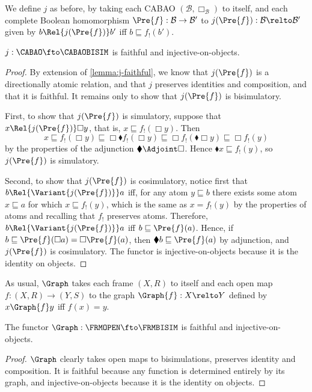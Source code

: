 \documentclass[a4paper,UKenglish,cleveref, autoref]{lipics-v2021}
\begin{document}
We define \(j\) as before, by taking each CABAO
\((\mathcal{B}, \Box_{\mathcal{B}})\) to itself, and each complete
Boolean homomorphism \(\Pre{f} : \mathcal{B} \to \mathcal{B}'\) to
\(j(\Pre{f}) : \mathcal{B} \relto \mathcal{B}'\) given by
\(b \Rel{j(\Pre{f})} b'\) iff \(b \sqsubseteq f_!(b')\).

\begin{lemma}
  \(j : \CABAO \fto \CABAOBISIM\) is faithful and injective-on-objects.
\end{lemma}
\begin{proof}
  By extension of \cref{lemma:j-faithful}, we know that \(j(\Pre{f})\) is a
  directionally atomic relation, and that \(j\) preserves identities and
  composition, and that it is faithful. It remains only to show that
  \(j(\Pre{f})\) is bisimulatory.

  First, to show that \(j(\Pre{f})\) is simulatory, suppose that
  \(x \Rel{j(\Pre{f})} \Box y\), that is, \(x \sqsubseteq f_!(\Box y)\).
  Then
  \[
    x
    \sqsubseteq f_!(\Box y)
    \sqsubseteq \Box \blacklozenge f_!(\Box y)
    \sqsubseteq \Box f_!(\blacklozenge \Box y)
    \sqsubseteq \Box f_!(y)
  \]
  by the properties of the adjunction \(\blacklozenge \Adjoint \Box\). Hence
  \(\blacklozenge x \sqsubseteq f_!(y)\), so \(j(\Pre{f})\) is simulatory.

  Second, to show that \(j(\Pre{f})\) is cosimulatory, notice first that
  \(b \Rel{\Variant{j(\Pre{f})}} a\) iff, for any atom \(y \sqsubseteq b\) there
  exists some atom \(x \sqsubseteq a\) for which \(x \sqsubseteq f_!(y)\), which
  is the same as \(x = f_!(y)\) by the properties of atoms and recalling that
  \(f_!\) preserves atoms. Therefore, \(b \Rel{\Variant{j(\Pre{f})}} a\) iff
  \(b \sqsubseteq \Pre{f}(a)\). Hence, if
  \(b \sqsubseteq \Pre{f}(\Box a) = \Box \Pre{f}(a)\), then
  \(\blacklozenge b \sqsubseteq \Pre{f}(a)\) by adjunction, and \(j(\Pre{f})\) is
  cosimulatory. The functor is injective-on-objects because it is the identity
  on objects.
\end{proof}

As usual, \(\Graph\) takes each frame \((X, R)\) to itself and each open map
\(f : (X, R) \to (Y, S)\) to the graph \(\Graph{f} : X \relto Y\) defined by
\(x \Graph{f} y\) iff \(f(x) = y\).

\begin{lemma}
  The functor \(\Graph : \FRMOPEN \fto \FRMBISIM\) is faithful and
  injective-on-objects.
\end{lemma}
\begin{proof}
  \(\Graph\) clearly takes open maps to bisimulations, preserves identity and
  composition. It is faithful because any function is determined entirely by its
  graph, and injective-on-objects because it is the identity on objects.
\end{proof}
\end{document}

